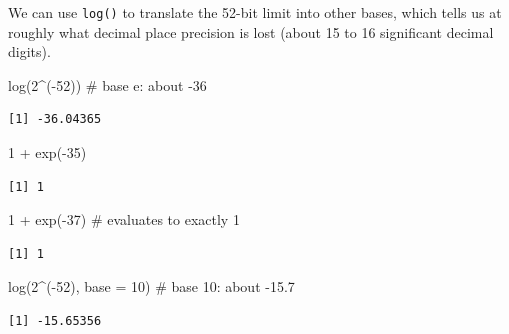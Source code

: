 \documentclass[
  letterpaper,
  DIV=11,
  numbers=noendperiod]{scrreprt}
\newenvironment{Shaded}{\begin{snugshade}}{\end{snugshade}}
\newcommand{\AttributeTok}[1]{\textcolor[rgb]{0.40,0.45,0.13}{#1}}
\newcommand{\CommentTok}[1]{\textcolor[rgb]{0.37,0.37,0.37}{#1}}
\newcommand{\DecValTok}[1]{\textcolor[rgb]{0.68,0.00,0.00}{#1}}
\newcommand{\FunctionTok}[1]{\textcolor[rgb]{0.28,0.35,0.67}{#1}}
\newcommand{\NormalTok}[1]{\textcolor[rgb]{0.00,0.23,0.31}{#1}}
\newcommand{\SpecialCharTok}[1]{\textcolor[rgb]{0.37,0.37,0.37}{#1}}
\begin{document}
We can use \texttt{log()} to translate the 52-bit limit into other
bases, which tells us at roughly what decimal place precision is lost
(about 15 to 16 significant decimal digits).

\begin{Shaded}
\begin{Highlighting}[]
\FunctionTok{log}\NormalTok{(}\DecValTok{2}\SpecialCharTok{\^{}}\NormalTok{(}\SpecialCharTok{{-}}\DecValTok{52}\NormalTok{))               }\CommentTok{\# base e: about {-}36}
\end{Highlighting}
\end{Shaded}

\begin{verbatim}
[1] -36.04365
\end{verbatim}

\begin{Shaded}
\begin{Highlighting}[]
\DecValTok{1} \SpecialCharTok{+} \FunctionTok{exp}\NormalTok{(}\SpecialCharTok{{-}}\DecValTok{35}\NormalTok{)}
\end{Highlighting}
\end{Shaded}

\begin{verbatim}
[1] 1
\end{verbatim}

\begin{Shaded}
\begin{Highlighting}[]
\DecValTok{1} \SpecialCharTok{+} \FunctionTok{exp}\NormalTok{(}\SpecialCharTok{{-}}\DecValTok{37}\NormalTok{)               }\CommentTok{\# evaluates to exactly 1}
\end{Highlighting}
\end{Shaded}

\begin{verbatim}
[1] 1
\end{verbatim}

\begin{Shaded}
\begin{Highlighting}[]
\FunctionTok{log}\NormalTok{(}\DecValTok{2}\SpecialCharTok{\^{}}\NormalTok{(}\SpecialCharTok{{-}}\DecValTok{52}\NormalTok{), }\AttributeTok{base =} \DecValTok{10}\NormalTok{)    }\CommentTok{\# base 10: about {-}15.7}
\end{Highlighting}
\end{Shaded}

\begin{verbatim}
[1] -15.65356
\end{verbatim}
\end{document}
